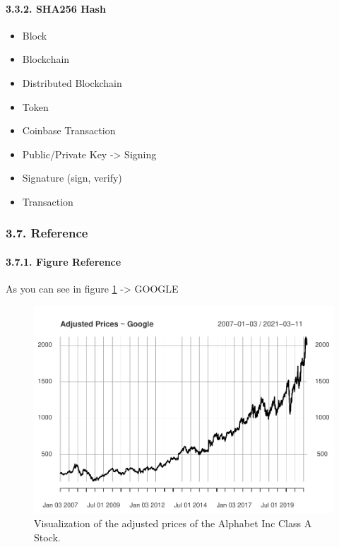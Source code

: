 \documentclass[
]{article}
\providecommand{\tightlist}{%
  \setlength{\itemsep}{0pt}\setlength{\parskip}{0pt}}
\begin{document}
\hypertarget{sha256-hash}{%
\paragraph{3.3.2. SHA256 Hash}\label{sha256-hash}}

\begin{itemize}
\tightlist
\item
  Block
\item
  Blockchain
\item
  Distributed Blockchain
\item
  Token
\item
  Coinbase Transaction
\item
  Public/Private Key -\textgreater{} Signing
\item
  Signature (sign, verify)
\item
  Transaction
\end{itemize}

\newpage

\hypertarget{reference}{%
\subsubsection{3.7. Reference}\label{reference}}

\hypertarget{figure-reference}{%
\paragraph{3.7.1. Figure Reference}\label{figure-reference}}

As you can see in figure \ref{fig:fig1} -\textgreater{} GOOGLE

\begin{figure}

{\centering \includegraphics[width=0.7\linewidth]{00_main_files/figure-latex/fig1-1} 

}

\caption{Visualization of the adjusted prices of the Alphabet Inc Class A Stock.}\label{fig:fig1}
\end{figure}
\end{document}
